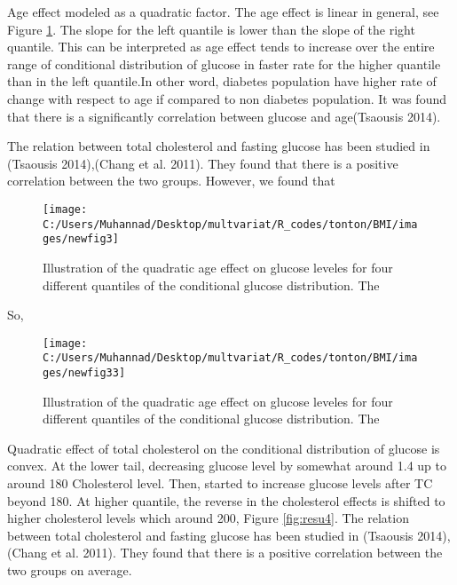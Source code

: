\documentclass[12pt,]{article}
\begin{document}
Age effect modeled as a quadratic factor. The age effect is linear in
general, see Figure \ref{fig:resu3}. The slope for the left quantile is
lower than the slope of the right quantile. This can be interpreted as
age effect tends to increase over the entire range of conditional
distribution of glucose in faster rate for the higher quantile than in
the left quantile.In other word, diabetes population have higher rate of
change with respect to age if compared to non diabetes population. It
was found that there is a significantly correlation between glucose and
age(Tsaousis 2014).

The relation between total cholesterol and fasting glucose has been
studied in (Tsaousis 2014),(Chang et al. 2011). They found that there is
a positive correlation between the two groups. However, we found that

\begin{figure}

{\centering \texttt{[image: C:/Users/Muhannad/Desktop/multvariat/R\_codes/tonton/BMI/images/newfig3]} 

}

\caption{Illustration of the quadratic age effect on glucose leveles for four different quantiles of the conditional glucose distribution.  The }\label{fig:resu3}
\end{figure}

So,

\begin{figure}

{\centering \texttt{[image: C:/Users/Muhannad/Desktop/multvariat/R\_codes/tonton/BMI/images/newfig33]} 

}

\caption{Illustration of the quadratic age effect on glucose leveles for four different quantiles of the conditional glucose distribution.  The }\label{fig:resu33}
\end{figure}

Quadratic effect of total cholesterol on the conditional distribution of
glucose is convex. At the lower tail, decreasing glucose level by
somewhat around 1.4 up to around 180 Cholesterol level. Then, started to
increase glucose levels after TC beyond 180. At higher quantile, the
reverse in the cholesterol effects is shifted to higher cholesterol
levels which around 200, Figure \ref{fig:resu4}. The relation between
total cholesterol and fasting glucose has been studied in (Tsaousis
2014),(Chang et al. 2011). They found that there is a positive
correlation between the two groups on average.
\end{document}
